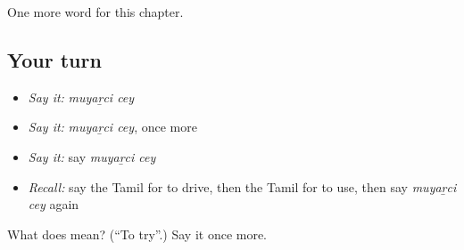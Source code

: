 \begin{grammarlens}[title={What you've built}]
One more word for this chapter.
\end{grammarlens}

\subsection*{Your turn}
\begin{itemize}
\raggedright
  \item \emph{Say it:} \emph{muyaṟci cey}
  \item \emph{Say it:} \emph{muyaṟci cey}, once more
  \item \emph{Say it:} say \emph{muyaṟci cey}
  \item \emph{Recall:} say the Tamil for to drive, then the Tamil for to use, then say \emph{muyaṟci cey} again
\end{itemize}

\begin{tcolorbox}[breakable,colback=teal!4,colframe=teal!35!black,title={Before you move on}]
What does   mean? (\textquotedblleft{}To try\textquotedblright{}.) Say it once more.
\end{tcolorbox}
